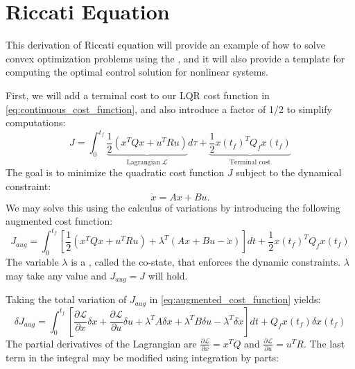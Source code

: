 \documentclass[a4 paper]{article}
\begin{document}
\section{Riccati Equation}\label{sec:riccati}

This derivation of Riccati equation will provide an example of how to solve convex optimization problems using the , 
and it will also provide a template for computing the optimal control solution for nonlinear systems. 

First, we will add a terminal cost to our LQR cost function in \ref{eq:continuous_cost_function}, 
and also introduce a factor of 1/2 to simplify computations:
\begin{equation}
    J = \int_{0}^{t_f} \underbrace{\frac{1}{2} \left( x^T Q x + u^T R u \right)}_\text{Lagrangian $\mathcal{L}$} d\tau + 
        \underbrace{\frac{1}{2} x(t_f)^T Q_f x(t_f)}_\text{Terminal cost}
\label{eq:cost_function}
\end{equation}
The goal is to minimize the quadratic cost function \( J \) subject to the dynamical constraint:
\begin{equation}
    \dot{x} = A x + B u.
\label{eq:dynamic_constraint}
\end{equation}
We may solve this using the calculus of variations by introducing the following augmented cost function:
\begin{equation}
    J_{aug} = \int_{0}^{t_f} \left[ \frac{1}{2} \left( x^T Q x + u^T R u \right) + \lambda^T (A x + B u - \dot{x}) \right] 
    dt + \frac{1}{2} x(t_f)^T Q_f x(t_f)
\label{eq:augmented_cost_function}
\end{equation}
The variable \( \lambda \) is a , called the co-state, that enforces the dynamic constraints. \( \lambda \) may 
take any value and \( J_{aug} = J \) will hold.

\bigbreak

Taking the total variation of \( J_{aug} \) in \ref{eq:augmented_cost_function} yields:
\begin{equation}
    \delta J_{aug} = \int_{0}^{t_f} \left[ \frac{\partial \mathcal{L}}{\partial x} \delta x + \frac{\partial \mathcal{L}}{\partial u} \delta u 
        + \lambda^T A \delta x + \lambda^T B \delta u - \lambda^T \delta \dot{x} \right] dt + Q_f x(t_f) \delta x(t_f)
\label{eq:total_variation}
\end{equation}
The partial derivatives of the Lagrangian are \( \frac{\partial \mathcal{L}}{\partial x} = x^T Q \) and 
\( \frac{\partial \mathcal{L}}{\partial u} = u^T R \). The last term in the integral may be modified using integration by parts:
\end{document}
